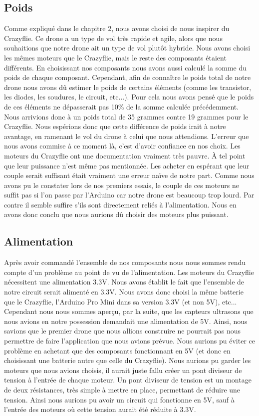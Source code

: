 \documentclass[a4paper,10pt]{report}
\begin{document}
      \subsection{Poids}
	Comme expliqué dans le chapitre 2, nous avons choisi de nous inspirer 
du Crazyflie. Ce drone a un type de vol très rapide et agile, alors que nous 
souhaitions que notre drone ait un type de vol plutôt hybride. Nous avons 
choisi les mêmes moteurs que le Crazyflie, mais le reste des composants étaient 
différents. En choisissant nos composants nous avons aussi calculé la somme du 
poids de chaque composant. Cependant, afin de connaître le poids total de 
notre drone nous avons dû estimer le poids de certains éléments (comme les 
transistor, les diodes, les soudures, le circuit, etc...). Pour cela nous avons 
pensé que le poids de ces éléments ne dépasserait pas 10\% de la somme calculée 
précédemment. Nous arrivions donc à un poids total de 35 grammes contre 19 
grammes pour le Crazyflie. Nous espérions donc que cette différence de poids 
irait à notre avantage, en ramenant le vol du drone à celui que nous 
attendions.
	L'erreur que nous avons commise à ce moment là, c'est d'avoir confiance 
en nos choix. Les moteurs du Crazyflie ont une documentation vraiment très 
pauvre. À tel point que leur puissance n'est même pas mentionnée. Les 
acheter en espérant que leur couple serait suffisant était vraiment une erreur 
naïve de notre part.
	Comme nous avons pu le constater lors de nos premiers essais, le couple 
de ces moteurs ne suffit pas si l'on passe par l'Arduino car notre drone est 
beaucoup trop lourd. Par contre il semble suffire s'ils sont directement reliés 
à l'alimentation. Nous en avons donc conclu que nous aurions dû choisir des 
moteurs plus puissant.
      
      \subsection{Alimentation}
	Après avoir commandé l'ensemble de nos composants nous nous sommes 
rendu compte d'un problème au point de vu de l'alimentation. Les moteurs du 
Crazyflie nécessitent une alimentation 3.3V. Nous avons établit le fait que 
l'ensemble de notre circuit serait alimenté en 3.3V. Nous avons donc choisi la 
même batterie que le Crazyflie, l'Arduino Pro Mini dans sa version 3.3V (et non 
5V), etc... Cependant nous nous sommes aperçu, par la suite, que les capteurs 
ultrasons que nous avions en notre possession demandait une alimentation de 5V. 
Ainsi, nous savions que le premier drone que nous allions construire ne 
pourrait pas nous permettre de faire l'application que nous avions prévue. Nous 
aurions pu éviter ce problème en achetant que des composants fonctionnant en 5V 
(et donc en choisissant une batterie autre que celle du Crazyflie). Nous 
aurions pu garder les moteurs que nous avions choisis, il aurait juste fallu 
créer un pont diviseur de tension\cite{pontdiviseur} à l'entrée de chaque 
moteur. Un pont diviseur de tension est un montage de deux résistances, très 
simple à mettre en place, permettant de réduire une tension. Ainsi nous aurions 
pu avoir un circuit qui fonctionne en 5V, sauf à l'entrée des moteurs où cette 
tension aurait été réduite à 3.3V.
\end{document}
